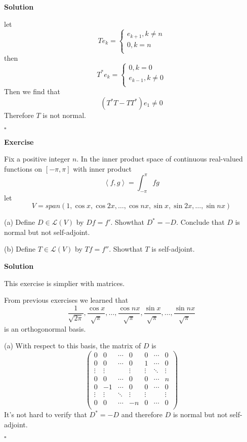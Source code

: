 \documentclass{article}
\newenvironment{exercise}{%
{\textbf{Exercise\\}
    }
}{
}
\newenvironment{solution}{%
{
    \textbf{Solution\\}
    }
}{
  \hfill $\square$ 
  \par\bigskip 
}
\begin{document}
\begin{CJK}{UTF8}{gkai}
\begin{solution}
    let 
    \[T e_k =
    \begin{cases}
        e_{k + 1} , k \neq n\\
        0 , k = n\\
    \end{cases} \]
    then 
    \[T^\ast e_k = \begin{cases}
        0, k = 0\\
        e_{k - 1}, k \neq 0\\
    \end{cases}\]
    Then we find that 
    \[(T^\ast T - T T^\ast) e_1 \neq 0\]
    Therefore $T$ is not normal.
\end{solution}

\begin{exercise}
    Fix a positive integer $n$. In the inner product space of continuous real-valued functions on $[-\pi,\pi]$ with inner product 
    \[\left<f,g\right> = \int_{-\pi}^{\pi} fg\]
    let 
    \[V = span(1,\cos x,\cos 2x,\ldots,\cos nx,\sin x,\sin 2x,\ldots,\sin nx)\]
  
    (a) Define $D \in\mathcal{L}(V)$ by $Df = f'$. Showthat $D^\ast  = -D$. Conclude that $D$ is normal but not self-adjoint.

    (b) Define $T \in \mathcal{L}(V)$ by $Tf = f''$. Showthat $T$ is self-adjoint.
\end{exercise}

\begin{solution}
    This exercise is simplier with matrices.

    From previous exercises we learned that 
    \[\dfrac{1}{\sqrt{2\pi}},\dfrac{\cos x}{\sqrt{\pi}},\ldots,\dfrac{\cos nx}{\sqrt{\pi}},\dfrac{\sin x}{\sqrt{\pi}},\ldots,\dfrac{\sin nx}{\sqrt{\pi}}\]
    is an orthogonormal basis. 
    
    (a) With respect to this basis, the matrix of $D$ is
    \[\begin{pmatrix}
        0&0&\cdots&0&0&\cdots&0\\
        0&0&\cdots&0&1&\cdots&0\\
        \vdots&\vdots&&\vdots&\vdots&\ddots&\vdots\\
        0&0&\cdots&0&0&\cdots&n\\
        0&-1&\cdots&0&0&\cdots&0\\
        \vdots&\vdots&\ddots&\vdots&\vdots&&\vdots\\
        0&0&\cdots&-n&0&\cdots&0\\
    \end{pmatrix}\]
    It's not hard to verify that $D^\ast = - D$ and therefore $D$ is normal but not self-adjoint.


\end{solution}
\end{CJK}
\end{document}
